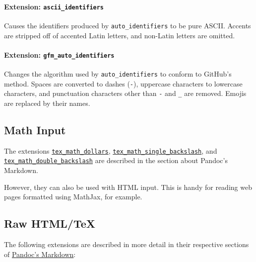 \documentclass[
]{article}
\begin{document}
\paragraph{\texorpdfstring{Extension:
\texttt{ascii\_identifiers}}{Extension: ascii\_identifiers}}\label{extension-ascii_identifiers}

Causes the identifiers produced by \texttt{auto\_identifiers} to be pure
ASCII. Accents are stripped off of accented Latin letters, and non-Latin
letters are omitted.

\paragraph{\texorpdfstring{Extension:
\texttt{gfm\_auto\_identifiers}}{Extension: gfm\_auto\_identifiers}}\label{extension-gfm_auto_identifiers}

Changes the algorithm used by \texttt{auto\_identifiers} to conform to
GitHub's method. Spaces are converted to dashes (\texttt{-}), uppercase
characters to lowercase characters, and punctuation characters other
than \texttt{-} and \texttt{\_} are removed. Emojis are replaced by
their names.

\subsection{Math Input}\label{math-input}

The extensions
\hyperref[extension-tex_math_dollars]{\texttt{tex\_math\_dollars}},
\hyperref[extension-tex_math_single_backslash]{\texttt{tex\_math\_single\_backslash}},
and
\hyperref[extension-tex_math_double_backslash]{\texttt{tex\_math\_double\_backslash}}
are described in the section about Pandoc's Markdown.

However, they can also be used with HTML input. This is handy for
reading web pages formatted using MathJax, for example.

\subsection{Raw HTML/TeX}\label{raw-htmltex}

The following extensions are described in more detail in their
respective sections of \hyperref[pandocs-markdown]{Pandoc's Markdown}:
\end{document}
